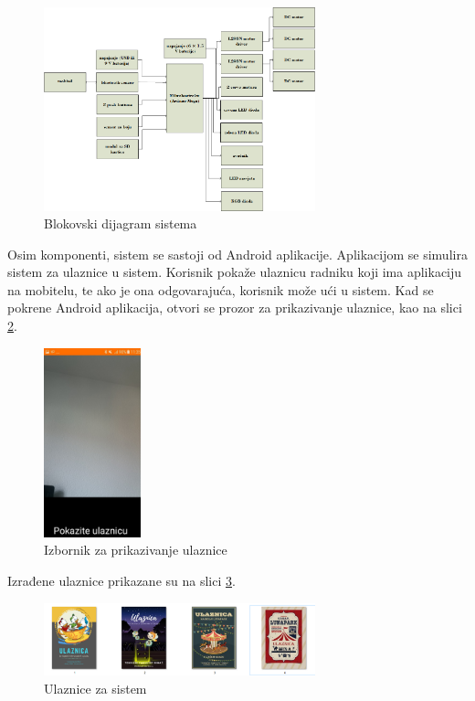 \begin{figure}[h!]
  \centering
  \includegraphics[width=0.7\textwidth]{dijagram}
  \caption{Blokovski dijagram sistema}
  \label{fig:Slika_dijagram}
\end{figure}

Osim komponenti, sistem se sastoji od Android aplikacije. Aplikacijom se simulira sistem za ulaznice u sistem. Korisnik pokaže ulaznicu radniku koji ima aplikaciju na mobitelu, te ako je ona odgovarajuća, korisnik može ući u sistem. Kad se pokrene Android aplikacija, otvori se prozor za prikazivanje ulaznice, kao na slici \ref{fig:Slika_prikazi}.

\begin{figure}[h!]
  \centering
  \includegraphics[width=0.25\textwidth]{prikazi}
  \caption{Izbornik za prikazivanje ulaznice}
  \label{fig:Slika_prikazi}
\end{figure}

Izrađene ulaznice prikazane su na slici \ref{fig:Slika_Ulaznice}. 
\newpage
\begin{figure}[h!]
  \centering
  \includegraphics[width=0.7\textwidth]{ulaznice.png}
  \caption{Ulaznice za sistem}
  \label{fig:Slika_Ulaznice}
\end{figure}

